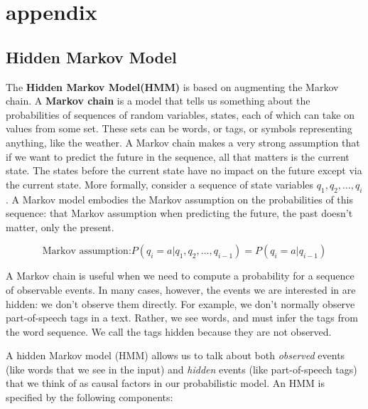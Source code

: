 \chapter{appendix}\label{chapter:appendixA}


\section{Hidden Markov Model\cite{jurafsky2000speech}}


The \textbf{Hidden Markov Model(HMM)} is based on augmenting the Markov chain. A \textbf{Markov chain} is a model that tells us something about the probabilities of sequences of random variables,
states, each of which can take on values from some set. These sets can be words, or
tags, or symbols representing anything, like the weather. A Markov chain makes a
very strong assumption that if we want to predict the future in the sequence, all that
matters is the current state. The states before the current state have no impact on the
future except via the current state. More formally, consider a sequence of state variables $q_1,q_2,\dots,q_i$. A Markov model embodies the Markov assumption on the probabilities of this sequence: that Markov assumption when predicting the future, the past doesn’t matter, only the present.

$$\text{Markov assumption:} P(q_i= a|q_1,q_2,\dots,q_{i-1}) = P(q_i=a|q_{i-1})$$

A Markov chain is useful when we need to compute a probability for a sequence of observable events. In many cases, however, the events we are interested in are hidden: we don't observe them directly. For example, we don't normally observe part-of-speech tags in a text. Rather, we see words, and must infer the tags from the word sequence. We call the tags hidden because they are not observed. 

A hidden Markov model (HMM) allows us to talk about both \textit{observed} events (like words that we see in the input) and \textit{hidden} events (like part-of-speech tags) that we think of as causal factors in our probabilistic model. An HMM is specified by the following components:



